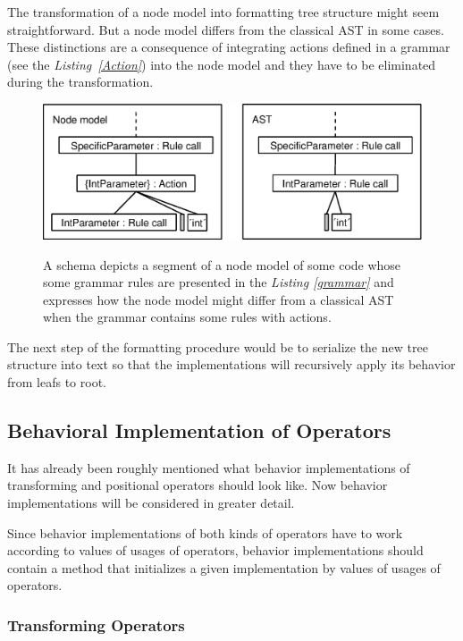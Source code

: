 \documentclass[12pt,notitlepage,a4paper]{report}
\begin{document}
The transformation of a node model into formatting tree structure might seem straightforward. But a node model differs from the classical AST in some cases.  These distinctions are a consequence of integrating actions defined in a grammar (see the \textit{Listing~\ref{Action}}) into the node model and they have to be eliminated during the transformation. 

\begin{figure}[h!]
\centering
\caption{A schema depicts a segment of a node model of some code whose some grammar rules are presented in the \textit{Listing \ref{grammar}} and expresses how the node model might differ from a classical AST when the grammar contains some rules with actions.}
\includegraphics[scale=0.51]{pictures/ActionDistinction.eps}
\label{ActionDistinction}
\end{figure}
\noindent


The next step of the formatting procedure would be to serialize the new tree structure into text so that the implementations will recursively apply its behavior from leafs to  root. 

\subsection{Behavioral Implementation of Operators}

It has already been roughly mentioned what  behavior implementations of transforming and positional operators should look like. Now behavior implementations will be considered in greater detail.

Since behavior implementations of both kinds of operators have to work according to values of usages of operators, behavior implementations should contain a method that initializes a given implementation by values of usages of operators.

\subsubsection{Transforming Operators}
\end{document}
